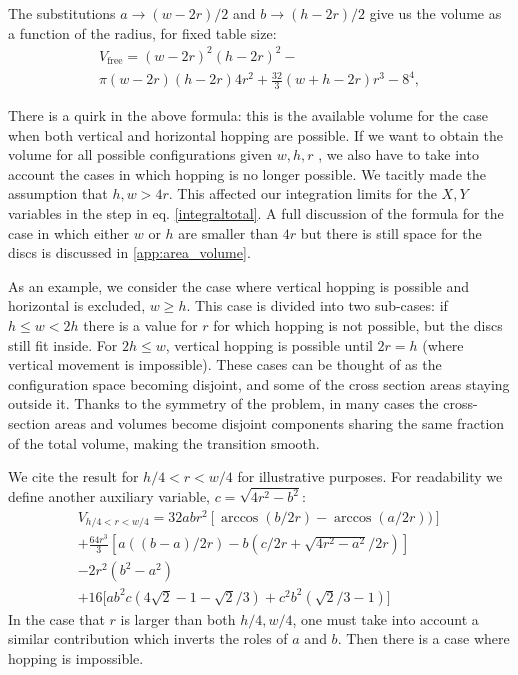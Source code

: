 \documentclass[superscriptaddress,pre,reprint,showpacs,onecolumn]{revtex4-1}
\begin{document}
The substitutions $a\rightarrow (w-2r)/2$ and $b\rightarrow (h-2r)/2$ give us
 the volume as a function of the radius, for fixed table size:
\begin{multline}\label{volumewhd}
 V_\text{free} 
= (w-2r)^{2} (h-2r)^{2}  - \\ 
 \pi (w-2r)(h-2r) 4 r^{2} + 
\textstyle \frac{32}{3} (w+h-2r) r^{3}  
- 8^{4},
\end{multline}

There is a quirk in the above formula:
this is the available volume for the case when both
vertical and horizontal hopping are possible.
If we want to obtain the volume for all possible configurations
given $w,h,r$ ,
we also have to take into account the cases in which hopping is no
longer possible. 
We tacitly made the assumption that $h,w>4r$.  This affected our 
integration limits for the $X,Y$ variables in the step in eq. \ref{integraltotal}. 
A full discussion of the formula for the case in which either
$w$ or $h$ are smaller than $4r$ but there is still space for
the discs is discussed in \ref{app:area_volume}.

As an example, we consider the case where vertical hopping is possible
and horizontal is excluded,  $w \geq h$.
This case is divided into two sub-cases: if
$ h \leq  w < 2 h $ there is a value for $r$ for which hopping is not possible,
but the discs still fit inside. For $ 2 h \leq w $, vertical hopping is
possible until $ 2 r= h$ (where vertical movement is impossible). These cases
can be thought of as the configuration space becoming disjoint, and
some of the cross section areas staying outside it. Thanks to the symmetry of
the problem, in many cases the cross-section areas and 
volumes become disjoint components sharing the same fraction of
the total volume, making the transition smooth.

We cite the  result for $h/4  <r< w/4$ for illustrative purposes.
For readability we define another auxiliary variable,
$c=\sqrt{4r^2-b^2}$:
\begin{multline}\label{VolumenCasoFeo}
V_{h/4<r<w/4} = 32abr^2[\arccos(b/2r)-\arccos(a/2r))]\\
+\frac{64 r^3}{3 }[a((b-a)/2r)-b(c/2r+\sqrt{4r^2-a^2}/2r)]\\
-2r^2 (b^2-a^2)\\ 
+16[ a b^2 c (4\sqrt{2}-1-\sqrt{2}/3)
+c^2b^2 (\sqrt{2}/3-1) \big]
\end{multline}
In the case that $r$ is larger than both $h/4, w/4$, one must take
into account a similar
contribution which inverts the roles of $a$ and $b$. Then there is
a case where hopping is impossible. 
\end{document}
